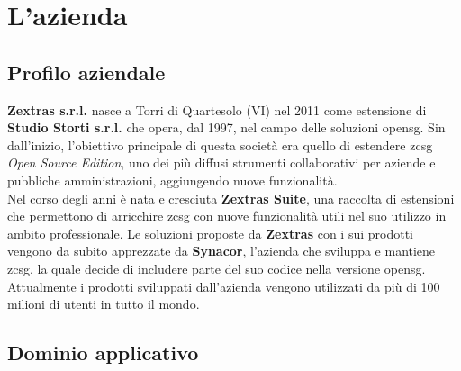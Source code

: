
\chapter{L'azienda}
\label{cap:azienda}

\section{Profilo aziendale}
    \textbf{Zextras s.r.l.} nasce a Torri di Quartesolo (VI) nel 2011 come estensione di \textbf{Studio Storti s.r.l.} che opera, dal 1997, nel campo delle soluzioni \gls{opensg}. Sin dall'inizio, l'obiettivo principale di questa società era quello di estendere \gls{zcsg} \textit{Open Source Edition}, uno dei più diffusi strumenti collaborativi per aziende e pubbliche amministrazioni, aggiungendo nuove funzionalità. \\
    Nel corso degli anni è nata e cresciuta \textbf{Zextras Suite}, una raccolta di estensioni che permettono di arricchire \gls{zcsg} con nuove funzionalità utili nel suo utilizzo in ambito professionale.
    Le soluzioni proposte da \textbf{Zextras} con i sui prodotti vengono da subito apprezzate da \textbf{Synacor}, l'azienda che sviluppa e mantiene \gls{zcsg}, la quale decide di includere parte del suo codice nella versione \gls{opensg}. Attualmente i prodotti sviluppati dall'azienda vengono utilizzati da più di 100 milioni di utenti in tutto il mondo.

\section{Dominio applicativo}
